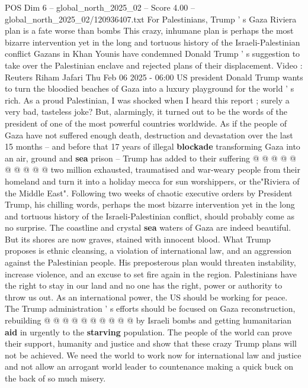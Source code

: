 \begin{textsample}{POS Dim 6 – global\_north\_2025\_02 – Score 4.00 – global\_north\_2025\_02/120936407.txt}  \label{ex:f6_pos_369}
For Palestinians, Trump ' s Gaza Riviera plan is a fate worse than bombs This crazy, inhumane plan is perhaps the most bizarre intervention yet in the long and tortuous history of the Israeli-Palestinian conflict Gazans in Khan Younis have condemned Donald Trump ' s suggestion to take over the Palestinian enclave and rejected plans of their displacement.
Video : Reuters Riham Jafari Thu Feb 06 2025 - 06:00 US president Donald Trump wants to turn the bloodied beaches of Gaza into a luxury playground for the world ' s rich.
As a proud Palestinian, I was shocked when I heard this report ; surely a very bad, tasteless joke?
But, alarmingly, it turned out to be the words of the president of one of the most powerful countries worldwide.
As if the people of Gaza have not suffered enough death, destruction and devastation over the last 15 months -- and before that 17 years of illegal \textbf{blockade} transforming Gaza into an air, ground and \textbf{sea} prison -- Trump has added to their suffering @ @ @ @ @ @ @ @ @ @ two million exhausted, traumatised and war-weary people from their homeland and turn it into a holiday mecca for sun worshippers, or the"Riviera of the Middle East".
Following two weeks of chaotic executive orders by President Trump, his chilling words, perhaps the most bizarre intervention yet in the long and tortuous history of the Israeli-Palestinian conflict, should probably come as no surprise.
The coastline and crystal \textbf{sea} waters of Gaza are indeed beautiful.
But its shores are now graves, stained with innocent blood.
What Trump proposes is ethnic cleansing, a violation of international law, and an aggression against the Palestinian people.
His preposterous plan would threaten instability, increase violence, and an excuse to set fire again in the region.
Palestinians have the right to stay in our land and no one has the right, power or authority to throw us out.
As an international power, the US should be working for peace.
The Trump administration ' s efforts should be focused on Gaza reconstruction, rebuilding @ @ @ @ @ @ @ @ @ @ by Israeli bombs and getting humanitarian \textbf{aid} in urgently to the \textbf{starving} population.
The people of the world can prove their support, humanity and justice and show that these crazy Trump plans will not be achieved.
We need the world to work now for international law and justice and not allow an arrogant world leader to countenance making a quick buck on the back of so much misery.

\end{textsample}
